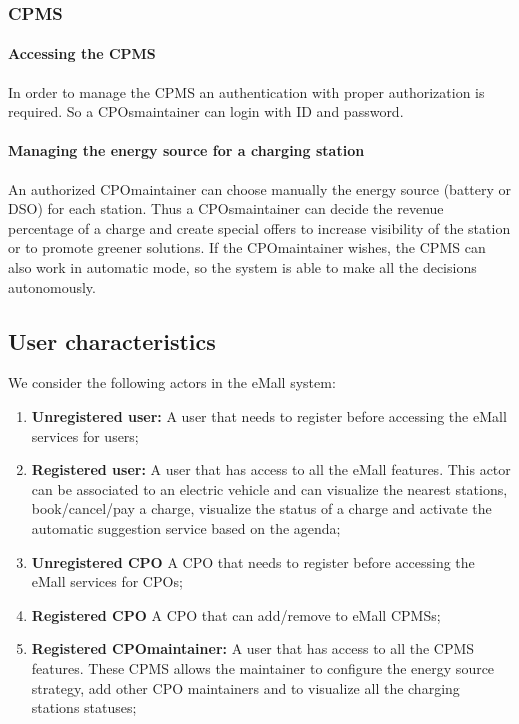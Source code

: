 \subsubsection{\acf{CPMS}}
\paragraph{Accessing the \ac{CPMS}}
In order to manage the \ac{CPMS} an authentication with proper authorization is required. So a \acp{CPO}maintainer can login with ID and password.

\paragraph{Managing the energy source for a charging station}
An authorized \ac{CPO}maintainer can choose manually the energy source (battery or \ac{DSO}) for each station.
Thus a \acp{CPO}maintainer can decide the revenue percentage of a charge and create special offers to increase visibility of the station or to promote greener solutions. If the \ac{CPO}maintainer wishes, the \ac{CPMS} can also work in automatic mode, so the system is able to make all the decisions autonomously.


\subsection{User characteristics}
We consider the following actors in the \ac{eMall} system:
\begin{enumerate}[label=\textbf{A\arabic*}]
    \item \textbf{Unregistered user:} A user that needs to register before accessing the \ac{eMall} services for users;
    \item \textbf{Registered user:} A user that has access to all the \ac{eMall} features.
          This actor can be associated to an electric vehicle and can visualize the nearest stations, book/cancel/pay a charge, visualize the status of a charge and activate the automatic suggestion service based on the agenda;
    \item \textbf{Unregistered \ac{CPO}} A \ac{CPO} that needs to register before accessing the \ac{eMall} services for \acp{CPO};
    \item \textbf{Registered \ac{CPO}} A \ac{CPO} that can add/remove to \ac{eMall} \acp{CPMS};
    \item \textbf{Registered \ac{CPO}maintainer:} A user that has access to all the \ac{CPMS} features. These \ac{CPMS} allows the maintainer to configure the energy source strategy, add other \ac{CPO} maintainers and to visualize all the charging stations statuses;
\end{enumerate}

